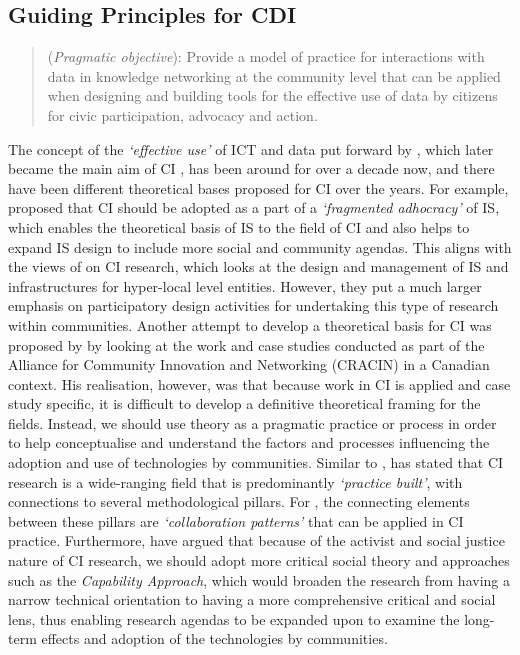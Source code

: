\subsection{Guiding Principles for CDI}
\begin{quote}
    (\textit{Pragmatic objective}): Provide a model of practice for interactions with data in knowledge networking at the community level that can be applied when designing and building tools for the effective use of data by citizens for civic participation, advocacy and action.
\end{quote}

The concept of the \textit{`effective use'} of ICT and data put forward by \citet{gurstein_effective_2003,gurstein_open_2011}, which later became the main aim of CI \citep{gurstein_what_2007}, has been around for over a decade now, and there have been different theoretical bases proposed for CI over the years. For example, \citet{stillman_community_2009} proposed that CI should be adopted as a part of a \textit{`fragmented adhocracy'} of IS, which enables the theoretical basis of IS to the field of CI and also helps to expand IS design to include more social and community agendas. This aligns with the views of \citet{carroll_participatory_2007} on CI research, which looks at the design and management of IS and infrastructures for hyper-local level entities. However, they put a much larger emphasis on participatory design activities for undertaking this type of research within communities. Another attempt to develop a theoretical basis for CI was proposed by \citet{gurstein_toward_2012} by looking at the work and case studies conducted as part of the Alliance for Community Innovation and Networking (CRACIN) in a Canadian context. His realisation, however, was that because work in CI is applied and case study specific, it is difficult to develop a definitive theoretical framing for the fields. Instead, we should use theory as a pragmatic practice or process in order to help conceptualise and understand the factors and processes influencing the adoption and use of technologies by communities. Similar to \citet{gurstein_toward_2012}, \citet{moor_collaboration_2009} has stated that CI research is a wide-ranging field that is predominantly \textit{`practice built'}, with connections to several methodological pillars. For \citet{moor_collaboration_2009}, the connecting elements between these pillars are \textit{`collaboration patterns'} that can be applied in CI practice. Furthermore, \citet{stillman_capability_2014} have argued that because of the activist and social justice nature of CI research, we should adopt more critical social theory and approaches such as the \textit{Capability Approach}, which would broaden the research from having a narrow technical orientation to having a more comprehensive critical and social lens, thus enabling research agendas to be expanded upon to examine the long-term effects and adoption of the technologies by communities.

